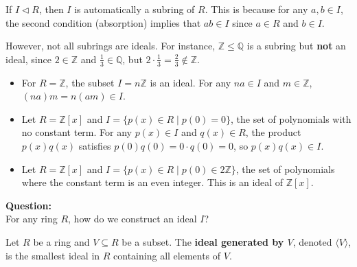 \begin{remark}
If $I \triangleleft R$, then $I$ is automatically a subring of $R$. This is because for any $a, b \in I$, the second condition (absorption) implies that $ab \in I$ since $a \in R$ and $b \in I$.

However, not all subrings are ideals. For instance, $\mathbb{Z} \leq \mathbb{Q}$ is a subring but \textbf{not} an ideal, since $2 \in \mathbb{Z}$ and $\frac{1}{3} \in \mathbb{Q}$, but $2 \cdot \frac{1}{3} = \frac{2}{3} \notin \mathbb{Z}$.
\end{remark}

\begin{example}
\begin{itemize}
    
    \item For $R = \mathbb{Z}$, the subset $I = n\mathbb{Z}$ is an ideal. For any $na \in I$ and $m \in \mathbb{Z}$, $(na)m = n(am) \in I$.
    \item Let $R = \mathbb{Z}[x]$ and $I = \{ p(x) \in R \mid p(0) = 0 \}$, the set of polynomials with no constant term. For any $p(x) \in I$ and $q(x) \in R$, the product $p(x)q(x)$ satisfies $p(0)q(0) = 0 \cdot q(0) = 0$, so $p(x)q(x) \in I$.
    \item Let $R = \mathbb{Z}[x]$ and $I = \{ p(x) \in R \mid p(0) \in 2\mathbb{Z} \}$, the set of polynomials where the constant term is an even integer. This is an ideal of $\mathbb{Z}[x]$.
\end{itemize}
\end{example}

\noindent\textbf{Question:}\\
For any ring $R$, how do we construct an ideal $I$?

\begin{definition}
Let $R$ be a ring and $V \subseteq R$ be a subset. The \textbf{ideal generated by $V$}, denoted $\langle V \rangle$, is the smallest ideal in $R$ containing all elements of $V$.
\end{definition}

